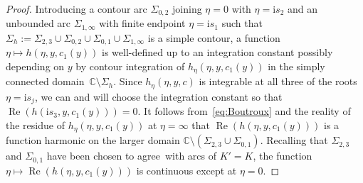 \documentclass[11pt]{article}
\numberwithin{equation}{section}
\numberwithin{equation}{section}
\begin{document}
\begin{proof}
Introducing a contour arc $\Sigma_{0,2}$ joining $\eta=0$ with $\eta=\mathrm{i} s_2$ and an unbounded arc $\Sigma_{1,\infty}$ with finite endpoint $\eta=\mathrm{i} s_1$ such that $\Sigma_h:=\Sigma_{2,3}\cup\Sigma_{0,2}\cup\Sigma_{0,1}\cup\Sigma_{1,\infty}$ is a simple contour, a function $\eta\mapsto h(\eta,y,c_1(y))$ is well-defined up to an integration constant possibly depending on $y$ by contour integration of $h_\eta(\eta,y,c_1(y))$ in the simply connected domain~${\mathbb{C}\setminus\Sigma_h}$. Since $h_\eta(\eta,y,c)$ is integrable at all three of the roots $\eta=\mathrm{i} s_j$, we can and will choose the integration constant so that $\operatorname{Re}(h(\mathrm{i} s_3,y,c_1(y)))=0$. It follows from~\eqref{eq:Boutroux} and the reality of the residue of $h_\eta(\eta,y,c_1(y))$ at $\eta=\infty$ that $\operatorname{Re}(h(\eta,y,c_1(y)))$ is a function harmonic on the larger domain $\mathbb{C}\setminus(\Sigma_{2,3}\cup\Sigma_{0,1})$. Recalling that $\Sigma_{2,3}$ and $\Sigma_{0,1}$ have been chosen to agree~with arcs of $K'=K$, the function $\eta\mapsto\operatorname{Re}(h(\eta,y,c_1(y)))$ is continuous except at ${\eta=0}$.
\end{proof}
\end{document}
